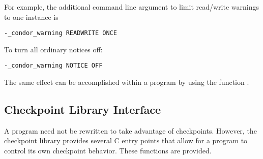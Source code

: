 For example, the additional command line argument 
to limit read/write warnings to one instance is

\begin{verbatim}
-_condor_warning READWRITE ONCE
\end{verbatim}

To turn all ordinary notices off:

\begin{verbatim}
-_condor_warning NOTICE OFF
\end{verbatim}

The same effect can be accomplished within a program by using the function
.

\subsection{\label{sec:ckpt-api}Checkpoint Library Interface}

A program need not be rewritten to take advantage of checkpoints.
However, the checkpoint library provides several C entry points
that allow for a program to control its own checkpoint behavior.
These functions are provided.

